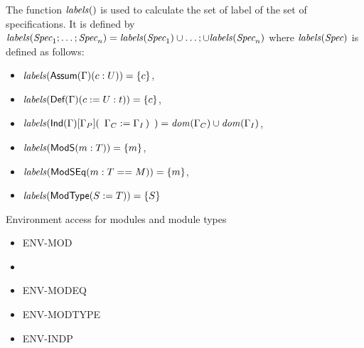 The function $\mathit{labels}()$ is used to calculate the set of label of
the set of specifications. It is defined by
$\mathit{labels}(\textit{Spec}_1;\dots;\textit{Spec}_n)=\mathit{labels}(\textit{Spec}_1)\cup\dots;\cup\mathit{labels}(\textit{Spec}_n)$
where $\mathit{labels}(\textit{Spec})$ is defined as follows:
\begin{itemize}
\item $\mathit{labels}(\mbox{{\sf Assum}$(\Gamma)(c:U)$})=\{c\}$,
\item $\mathit{labels}(\mbox{{\sf Def}$(\Gamma)(c:=U:t)$})=\{c\}$,
\item
  $\mathit{labels}(\mbox{{\sf Ind}$(\Gamma)[\Gamma_P](\begin{array}[t]{l}\Gamma_C:=\Gamma_I \,)\end{array}$})=\mathit{dom}(\Gamma_C)\cup\mathit{dom}(\Gamma_I)$,
\item $\mathit{labels}({\sf ModS}({m}:{T}))=\{m\}$,
\item $\mathit{labels}({\sf ModSEq}({m}:{T}=={M}))=\{m\}$,
\item $\mathit{labels}({\sf ModType}({S}:={T}))=\{S\}$
\end{itemize}
Environment access for modules and module types
\begin{itemize}
\item []ENV-MOD
\item []
\item []ENV-MODEQ
\item []ENV-MODTYPE
\item []ENV-INDP
\end{itemize}





